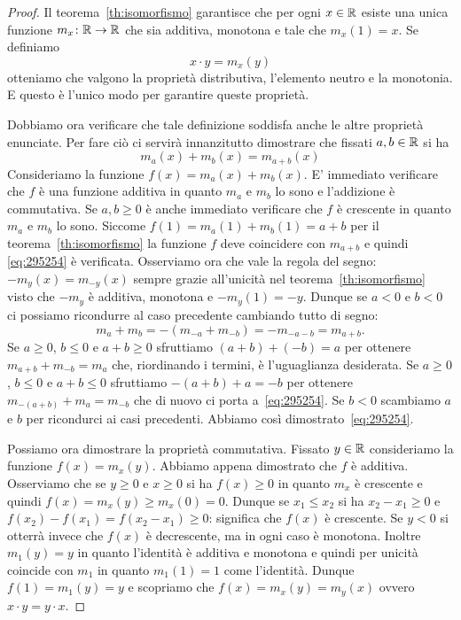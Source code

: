 \begin{proof}
Il teorema~\ref{th:isomorfismo} garantisce che 
per ogni $x\in {\mathbb R}$ esiste una unica funzione $m_x\colon {\mathbb R}\to{\mathbb R}$
che sia additiva, monotona e tale che $m_x(1)=x$.
Se definiamo 
\[
  x\cdot y = m_x(y)  
\]
otteniamo che valgono la proprietà distributiva, l'elemento neutro
e la monotonia. 
E questo è l'unico modo per garantire queste proprietà.

Dobbiamo ora verificare che tale definizione soddisfa anche le altre 
proprietà enunciate. 
Per fare ciò ci servirà innanzitutto dimostrare 
che fissati $a,b\in {\mathbb R}$ si ha 
\begin{equation}\label{eq:295254}
 m_a(x) + m_b(x) = m_{a+b}(x)  
\end{equation}
Consideriamo la funzione $f(x) = m_a(x) + m_b(x)$.
E' immediato verificare che $f$ è una funzione additiva
in quanto $m_a$ e $m_b$ lo sono e l'addizione è commutativa.
Se $a,b\ge 0$ è anche immediato verificare che $f$ è crescente 
in quanto $m_a$ e $m_b$ lo sono. 
Siccome $f(1) = m_a(1)+m_b(1)=a+b$ per il teorema~\ref{th:isomorfismo}
la funzione $f$ deve coincidere con $m_{a+b}$ e quindi 
\eqref{eq:295254} è verificata.
Osserviamo ora che vale la regola del segno: $-m_y(x) = m_{-y}(x)$ 
sempre grazie all'unicità nel 
teorema~\ref{th:isomorfismo} visto che $-m_y$ è additiva, monotona 
e $-m_y(1)=-y$. 
Dunque se $a<0$ e $b<0$ ci possiamo ricondurre al caso precedente 
cambiando tutto di segno:
\[
m_{a}+m_{b} = - (m_{-a}+m_{-b}) = - m_{-a -b} = m_{a+b}. 
\]
Se $a\ge 0$, $b\le 0$ e $a+b\ge 0$ sfruttiamo $(a+b) + (-b) = a$
per ottenere 
$m_{a+b} + m_{-b} = m_a$ che, riordinando i termini, 
è l'uguaglianza desiderata.
Se $a\ge 0$, $b\le 0$ e $a+b\le 0$ sfruttiamo $-(a+b) + a = -b$
per ottenere $m_{-(a+b)} + m_a = m_{-b}$ 
che di nuovo ci porta a~\eqref{eq:295254}.
Se $b<0$ scambiamo $a$ e $b$ per ricondurci ai casi precedenti.
Abbiamo così dimostrato~\eqref{eq:295254}.

Possiamo ora dimostrare la proprietà commutativa.
Fissato $y\in {\mathbb R}$ consideriamo la funzione $f(x) = m_x(y)$.
Abbiamo appena dimostrato che $f$ è additiva.
Osserviamo che se $y\ge 0$ e $x\ge 0$ si ha $f(x)\ge 0$ 
in quanto $m_x$ è crescente e quindi $f(x)=m_x(y) \ge m_x(0)=0$.
Dunque se $x_1\le x_2$ si ha $x_2-x_1\ge 0$ 
e $f(x_2)-f(x_1) = f(x_2-x_1)\ge 0$: significa 
che $f(x)$ è crescente. Se $y<0$ si otterrà invece che 
$f(x)$ è decrescente, ma in ogni caso è monotona.
Inoltre $m_1(y) = y$ in quanto l'identità è additiva 
e monotona e quindi per unicità coincide con $m_1$ 
in quanto $m_1(1)=1$ come l'identità.
Dunque $f(1) = m_1(y) = y$
e scopriamo che $f(x) = m_x(y) = m_y(x)$ ovvero 
$x\cdot y = y\cdot x$.


\end{proof}
